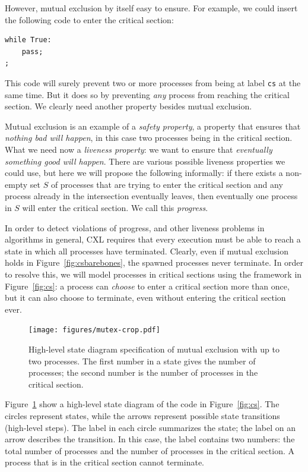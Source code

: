 \documentclass{report}
\newenvironment{code}{
\tcolorbox
}{
\endtcolorbox
}
\begin{document}
However, mutual exclusion by itself easy to ensure.
For example, we could insert the following code to enter the
critical section:
\begin{code}
\begin{verbatim}
while True:
    pass;
;
\end{verbatim}
\end{code}
This code will surely prevent two or more processes from being
at label \texttt{cs} at the same time.
But it does so by preventing \emph{any} process from reaching
the critical section.
We clearly need another property besides mutual exclusion.

Mutual exclusion is an example of a \emph{safety property},
a property that ensures that \emph{nothing bad will happen}, in this case
two processes being in the critical section.
What we need now a \emph{liveness property}:
we want to ensure that
\emph{eventually something good will happen}.
There are various possible liveness properties we could use,
but here we will propose the following informally: if there exists a non-empty
set $S$ of processes that are trying to enter the critical section and any
process already in the intersection eventually leaves, then eventually one
process in $S$ will enter the critical section.
We call this \emph{progress}.

In order to detect violations of progress, and other liveness problems in
algorithms in general, CXL requires that every execution must be
able to reach a state in which all processes have terminated.
Clearly, even if mutual exclusion holds in Figure~\ref{fig:csbarebones},
the spawned processes never terminate.  In order to resolve this, we
will model processes in critical sections using the framework in
Figure~\ref{fig:cs}: a process can \emph{choose} to enter a
critical section more than once, but it can also choose to terminate, even
without entering the critical section ever.

\begin{figure}
\begin{center}
\texttt{[image: figures/mutex-crop.pdf]}
\end{center}
\caption{High-level state diagram specification of mutual exclusion with up to two processes.
The first number in a state gives the number of processes; the second number is the
number of processes in the critical section.}
\label{fig:mutex}
\end{figure}

Figure~\ref{fig:mutex} show a high-level state diagram
of the code in
Figure~\ref{fig:cs}.
The circles represent states, while the arrows represent possible state
transitions (high-level steps).  The label in each circle summarizes the state;
the label on an arrow describes the transition.  In this case,
the label contains two numbers: the total number of processes and the number
of processes in the critical section.  A process that is in the critical
section cannot terminate.
\end{document}
